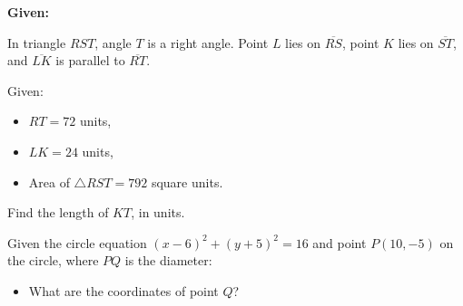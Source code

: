\documentclass[12pt]{article}
\begin{document}
\begin{tcolorbox}[colback=green!10, colframe=green!50!black, title=Question 12: Triangle Similarity and Area]
\textbf{Given:} 

In triangle \( RST \), angle \( T \) is a right angle. Point \( L \) lies on \( \overline{RS} \), point \( K \) lies on \( \overline{ST} \), and \( \overline{LK} \) is parallel to \( \overline{RT} \).

Given:
\begin{itemize}
    \item \( RT = 72 \) units,
    \item \( LK = 24 \) units,
    \item Area of \( \triangle RST = 792 \) square units.
\end{itemize}

Find the length of \( KT \), in units.


\end{tcolorbox}
\newpage
\begin{tcolorbox}[colback=green!10, colframe=green!50!black,title=Question 3: Circle Equation (Geometry)]
Given the circle equation \( (x - 6)^2 + (y + 5)^2 = 16 \) and point \( P(10, -5) \) on the circle, where \( PQ \) is the diameter:
\begin{itemize}
    \item What are the coordinates of point \( Q \)?
\end{itemize}
\end{tcolorbox}
\end{document}
